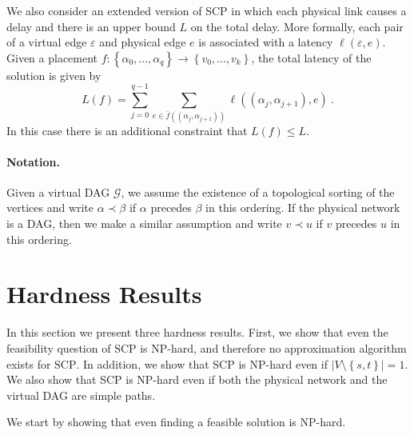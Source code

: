 \documentclass[runningheads]{llncs}
\newcommand{\eqdf}{\stackrel{\scriptscriptstyle \triangle}{=}}
\newcommand{\set}[1]{\left\{ #1 \right\}}
\newcommand{\abs}[1]{\left| #1 \right|}
\newcommand{\eps}{\varepsilon}
\newcommand{\scp}{\textsc{SCP}\xspace}
\newcommand{\calE}{\mathcal{E}}
\newcommand{\calG}{\mathcal{G}}
\newcommand{\calV}{\mathcal{V}}
\begin{document}

We also consider an extended version of \scp in which each physical
link causes a delay and there is an upper bound $L$ on the total
delay.  More formally, each pair of a virtual edge $\eps$ and physical
edge $e$ is associated with a latency $\ell(\eps,e)$.
%
Given a placement $f: \set{\alpha_0,\ldots,\alpha_q} \to
\set{v_0,\ldots,v_k}$, the total latency of the solution is given by
\[
L(f)
= \sum_{j=0}^{q-1} \sum_{e \in \bar{f}((\alpha_j,\alpha_{j+1}))} \ell((\alpha_j,\alpha_{j+1}),e)
~.
\]
In this case there is an additional constraint that $L(f) \leq L$.



%

\paragraph*{Notation.}
%
Given a virtual DAG $\calG$, we assume the existence of a topological
sorting of the vertices and write $\alpha \prec \beta$ if $\alpha$
precedes $\beta$ in this ordering.  If the physical network is a DAG,
then we make a similar assumption and write $v \prec u$ if $v$
precedes $u$ in this ordering.



\section{Hardness Results}

In this section we present three hardness results.  First, we show
that even the feasibility question of \scp is NP-hard, and therefore
no approximation algorithm exists for \scp.  In addition, we show that
\scp is NP-hard even if $\abs{V \setminus \set{s,t}} = 1$.  We also
show that \scp is NP-hard even if both the physical network and the
virtual DAG are simple paths.

We start by showing that even finding a feasible solution is NP-hard.
\end{document}
